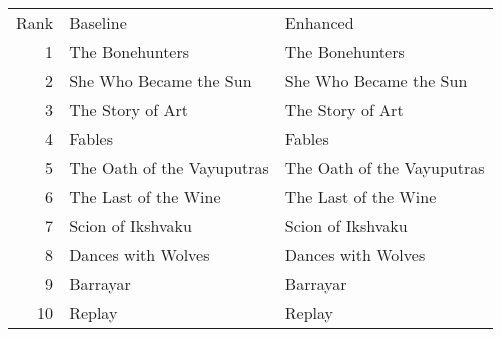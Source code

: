 \begin{tabular}{rll}
Rank & Baseline & Enhanced \\
1 & The Bonehunters & The Bonehunters \\
2 & She Who Became the Sun & She Who Became the Sun \\
3 & The Story of Art & The Story of Art \\
4 & Fables & Fables \\
5 & The Oath of the Vayuputras & The Oath of the Vayuputras \\
6 & The Last of the Wine & The Last of the Wine \\
7 & Scion of Ikshvaku & Scion of Ikshvaku \\
8 & Dances with Wolves & Dances with Wolves \\
9 & Barrayar & Barrayar \\
10 & Replay & Replay \\
\end{tabular}
